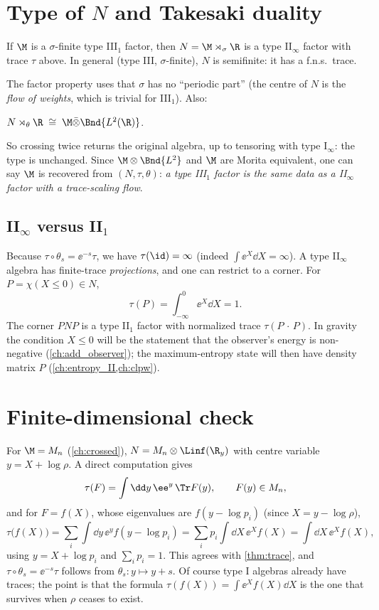 \section{Type of $N$ and Takesaki duality}

\begin{theorem}
If $\M$ is a $\sigma$-finite type III$_1$ factor, then $N=\M\rtimes_\sigma\R$ is a type II$_\infty$ factor with trace $\tau$ above. In general (type III, $\sigma$-finite), $N$ is semifinite: it has a f.n.s.\ trace.
\end{theorem}
The factor property uses that $\sigma$ has no ``periodic part'' (the centre of $N$ is the \emph{flow of weights}, which is trivial for III$_1$). Also:
\begin{theorem}
$N\rtimes_\theta\R\;\cong\;\M\bar\otimes\Bnd{L^2(\R)}$.
\end{theorem}
So crossing twice returns the original algebra, up to tensoring with type I$_\infty$: the type is unchanged. Since $\M\otimes\Bnd{L^2}$ and $\M$ are Morita equivalent, one can say $\M$ is recovered from $(N,\tau,\theta)$: \emph{a type III$_1$ factor is the same data as a II$_\infty$ factor with a trace-scaling flow}.

\subsection*{II$_\infty$ versus II$_1$}
Because $\tau\circ\theta_s=\ee^{-s}\tau$, we have $\tau(\id)=\infty$ (indeed $\int\ee^{X}\dd X=\infty$). A type II$_\infty$ algebra has finite-trace \emph{projections}, and one can restrict to a corner. For $P=\chi(X\le0)\in N$,
\begin{equation}
\tau(P)=\int_{-\infty}^0\ee^{X}\dd X=1.
\end{equation}
The corner $PNP$ is a type II$_1$ factor with normalized trace $\tau(P\,\cdot\,P)$. In gravity the condition $X\le0$ will be the statement that the observer's energy is non-negative (\cref{ch:add_observer}); the maximum-entropy state will then have density matrix $P$ (\cref{ch:entropy_II,ch:clpw}).

\section{Finite-dimensional check}
For $\M=M_n$ (\cref{ch:crossed}), $N=M_n\otimes\Linf(\R_y)$ with centre variable $y=X+\log\rho$. A direct computation gives
\begin{equation}
\tau(F)=\int\dd y\,\ee^{y}\,\Tr F(y),\qquad F(y)\in M_n,
\end{equation}
and for $F=f(X)$, whose eigenvalues are $f(y-\log p_i)$ (since $X=y-\log\rho$),
\begin{equation}
\tau\big(f(X)\big)=\sum_i\int\dd y\,\ee^{y}f(y-\log p_i)=\sum_ip_i\int\dd X\,\ee^{X}f(X)=\int\dd X\,\ee^Xf(X),
\end{equation}
using $y=X+\log p_i$ and $\sum_ip_i=1$. This agrees with \cref{thm:trace}, and $\tau\circ\theta_s=\ee^{-s}\tau$ follows from $\theta_s:y\mapsto y+s$. Of course type I algebras already have traces; the point is that the formula $\tau(f(X))=\int\ee^Xf(X)\dd X$ is the one that survives when $\rho$ ceases to exist.


